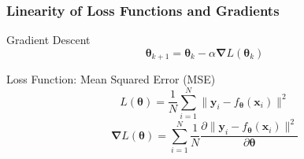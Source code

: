 \documentclass{beamer}
\begin{document}
\begin{frame}
    \frametitle{Linearity of Loss Functions and Gradients}


    \begin{block}{Gradient Descent}
        \[\boldsymbol{\theta}_{k + 1} = \boldsymbol{\theta}_{k} - \alpha\boldsymbol{\nabla} L(\boldsymbol{\theta}_{k})\]
    \end{block}
    
    \begin{block}{Loss Function: Mean Squared Error (MSE)}
        \[L(\boldsymbol{\theta}) = \frac{1}{N}\sum_{i = 1}^{N} \lVert\boldsymbol{y}_i - f_{\boldsymbol{\theta}}(\boldsymbol{x}_i)\rVert^2\]
        \[\boldsymbol{\nabla}L(\boldsymbol{\theta}) = \sum_{i = 1}^{N}\frac{1}{N}\frac{\partial\lVert\boldsymbol{y}_i - f_{\boldsymbol{\theta}}(\boldsymbol{x}_i)\rVert^2}{\partial\boldsymbol{\theta}}\]
    \end{block}

\end{frame}
\end{document}
